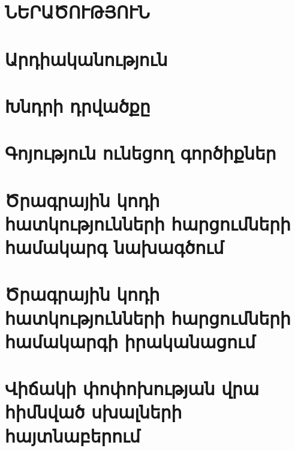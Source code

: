 \documentclass[a4paper, 12pt]{report}
\begin{document}
    

    \setcounter{page}{2}
    \setcounter{tocdepth}{3}
    \setcounter{secnumdepth}{3}

    

    

    \newpage
    \begin{center}
        \tableofcontents
    \end{center}

    \clearpage

    \section*{\textbf{ՆԵՐԱԾՈՒԹՅՈՒՆ}}
    

    \section{Արդիականություն}\label{sec:}
    

    \section{Խնդրի դրվածքը}\label{sec:-}
    

    \section{Գոյություն ունեցող գործիքներ}\label{sec:--}
    

    \section{Ծրագրային կոդի հատկությունների հարցումների համակարգ նախագծում}\label{sec:-----}
    

    \section{Ծրագրային կոդի հատկությունների հարցումների համակարգի իրականացում}\label{sec:-----2}
    

    \section{Վիճակի փոփոխության վրա հիմնված սխալների հայտնաբերում}\label{sec:2}
    
\end{document}
